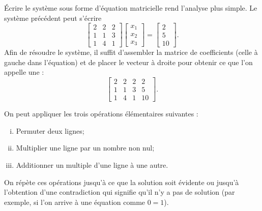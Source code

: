 Écrire le système sous forme d'équation matricielle rend l'analyse plus simple. Le système précédent peut s'écrire
\begin{equation*}
\begin{bmatrix}
2 & 2 & 2 \\
1 & 1 & 3 \\
1 & 4 & 1 
\end{bmatrix}
\begin{bmatrix}
x_1 \\
x_2 \\
x_3
\end{bmatrix} 
=
\begin{bmatrix}
2 \\
5 \\
10
\end{bmatrix} .
\end{equation*}
Afin de résoudre le système, il suffit d'assembler la matrice de coefficients (celle à gauche dans l'équation) et de placer le vecteur à droite pour obtenir ce que l'on appelle une
\emph{} :
\begin{equation*}
\left[
\begin{array}{ccc|c}
2 & 2 & 2 & 2 \\
1 & 1 & 3 & 5 \\
1 & 4 & 1 & 10
\end{array}
\right] .
\end{equation*}

\pagebreak[2]
On peut appliquer les trois opérations élémentaires suivantes :
\begin{enumerate}[(i)]
\item Permuter deux lignes;
\item Multiplier une ligne par un nombre non nul;
\item Additionner un multiple d'une ligne à une autre.
\end{enumerate}
On répète ces opérations jusqu'à ce que la solution soit évidente ou jusqu'à l'obtention d'une contradiction qui signifie qu'il n'y a pas de solution (par exemple, si l'on arrive à une équation comme $0=1$).

